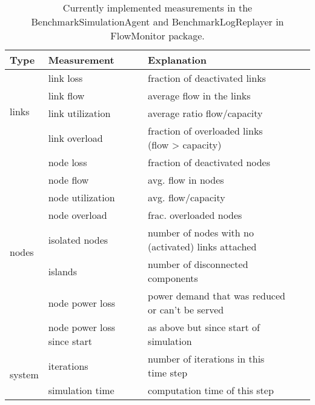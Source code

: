 \documentclass[11pt,fleqn]{book} %
\newcommand{\BenchmarkAgent}{BenchmarkSimulationAgent}
\newcommand{\BenchmarkLogReplayer}{BenchmarkLogReplayer}
\begin{document}
\begin{table}[h]
	\centering
	\begin{tabular}{|l| l |l| l |l|}
	\hline
	\rowcolor{Gray}
	\textbf{Type}&\textbf{Measurement}&\textbf{Explanation}\\ \hline
	\multirow{4}{*}{links} & link loss & fraction of deactivated links\\ 
	\cline{2-3} & link flow & average flow in the links\\
	\cline{2-3} & link utilization & average ratio flow/capacity\\	
	\cline{2-3} & link overload & fraction of overloaded links (flow > capacity)\\ \hline
	\multirow{8}{*}{nodes} & node loss & fraction of deactivated nodes\\ 
	\cline{2-3} & node flow & avg. flow in nodes\\
	\cline{2-3} & node utilization & avg. flow/capacity\\	
	\cline{2-3} & node overload & frac. overloaded nodes\\
	\cline{2-3} & isolated nodes & number of nodes with no (activated) links attached\\
	\cline{2-3} & islands & number of disconnected components\\	
	\cline{2-3} & node power loss & power demand that was reduced or can't be served\\	
	\cline{2-3} & node power loss since start & as above but since start of simulation\\ \hline
	\multirow{2}{*}{system} & iterations & number of iterations in this time step\\ 	
	\cline{2-3} & simulation time & computation time of this step\\ \hline

	\end{tabular}
	\label{table:measurements}
	\caption{Currently implemented measurements in the \BenchmarkAgent{} and \BenchmarkLogReplayer{} in FlowMonitor package.}
\end{table}
\end{document}
